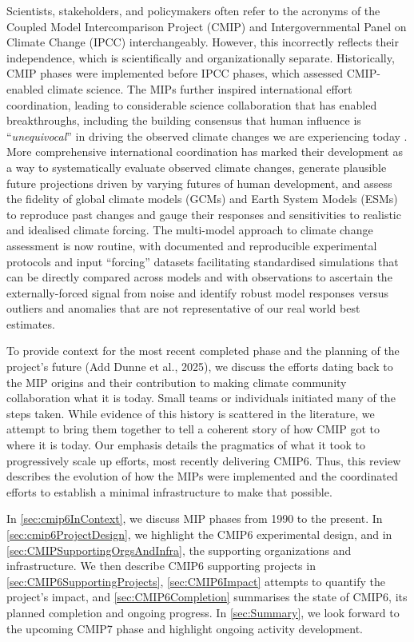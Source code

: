 \documentclass[manuscript]{copernicus}
\def\cred#1{{\color{red}#1}}
\begin{document}
Scientists, stakeholders, and policymakers often refer to the acronyms of the Coupled Model Intercomparison Project (CMIP) and Intergovernmental Panel on Climate Change (IPCC) interchangeably. However, this incorrectly reflects their independence, which is scientifically and organizationally separate. Historically, CMIP phases were implemented before IPCC phases, which assessed CMIP-enabled climate science. The MIPs further inspired international effort coordination, leading to considerable science collaboration that has enabled breakthroughs, including the building consensus that human influence is ``\textit{unequivocal}'' in driving the observed climate changes we are experiencing today \citep[see \autoref{fig:fig6-MIPImpact};][]{eyring_human_2021}. More comprehensive international coordination has marked their development as a way to systematically evaluate observed climate changes, generate plausible future projections driven by varying futures of human development, and assess the fidelity of global climate models (GCMs) and Earth System Models (ESMs) to reproduce past changes and gauge their responses and sensitivities to realistic and idealised climate forcing. The multi-model approach to climate change assessment is now routine, with documented and reproducible experimental protocols and input ``forcing'' datasets facilitating standardised simulations that can be directly compared across models and with observations to ascertain the externally-forced signal from noise and identify robust model responses versus outliers and anomalies that are not representative of our real world best estimates.

To provide context for the \cred{most recent completed phase \citep[CMIP6;][]{eyring_overview_2016} and the planning of the project’s future (Add Dunne et al., 2025)}, we discuss the efforts dating back to the MIP origins and their contribution to making climate community collaboration what it is today. Small teams or individuals initiated many of the steps taken. While evidence of this history is scattered in the literature, we attempt to bring them together to tell a coherent story of how CMIP got to where it is today. Our emphasis details the pragmatics of what it took to progressively scale up efforts, most recently delivering CMIP6. Thus, this review describes the evolution of how the MIPs were implemented and the coordinated efforts to establish a minimal infrastructure to make that possible.

In \autoref{sec:cmip6InContext}, we discuss MIP phases from 1990 to the present. In \autoref{sec:cmip6ProjectDesign}, we highlight the CMIP6 experimental design, and in \autoref{sec:CMIPSupportingOrgsAndInfra}, the supporting organizations and infrastructure. We then describe CMIP6 supporting projects in \autoref{sec:CMIP6SupportingProjects}, \autoref{sec:CMIP6Impact} attempts to quantify the project's impact, and \autoref{sec:CMIP6Completion} summarises the state of CMIP6, its planned completion and ongoing progress. In \autoref{sec:Summary}, we look forward to the upcoming CMIP7 phase and highlight ongoing activity development.
\end{document}
